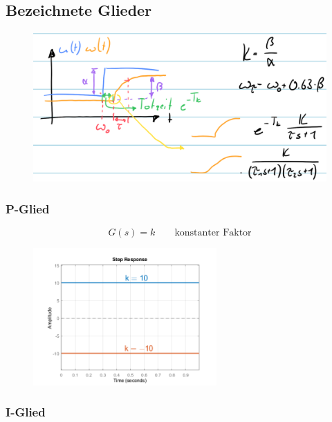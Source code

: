 \documentclass[
  10pt,
  a4paper,
  twocolumn]{article}
\numberwithin{equation}{section}
\begin{document}
\hypertarget{bezeichnete-glieder}{%
\subsection{Bezeichnete Glieder}\label{bezeichnete-glieder}}

\begin{figure}[H]

{\centering \includegraphics{images/paste-85.png}

}

\end{figure}

\hypertarget{p-glied}{%
\subsubsection{P-Glied}\label{p-glied}}

\[
G(s)=k\qquad \text{konstanter Faktor}
\]

\begin{figure}[H]

{\centering \includegraphics[width=7cm,height=\textheight]{images/paste-23.png}

}

\end{figure}

\hypertarget{i-glied}{%
\subsubsection{I-Glied}\label{i-glied}}
\end{document}
